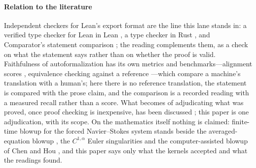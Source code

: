 \documentclass[preprint,11pt,authoryear,a4paper]{elsarticle}
\begin{document}
\paragraph{Relation to the literature} Independent checkers for Lean's export format are the line this lane stands in: a verified type checker for Lean in Lean \citep{Carneiro24Lean4Lean}, a type checker in Rust \citep{Nanoda}, and Comparator's statement comparison \citep{Comparator}; the reading complements them, as a check on what the statement says rather than on whether the proof is valid. Faithfulness of autoformalization has its own metrics and benchmarks---alignment scores \citep{Lu24FormalAlign}, equivalence checking against a reference \citep{Liu25BEq,Poiroux25BEq}---which compare a machine's translation with a human's; here there is no reference translation, the statement is compared with the prose claim, and the comparison is a recorded reading with a measured recall rather than a score. What becomes of adjudicating what was proved, once proof checking is inexpensive, has been discussed \citep{Kallel26,Avigad24}; this paper is one adjudication, with its scope. On the mathematics itself nothing is claimed: finite-time blowup for the forced Navier--Stokes system stands beside the averaged-equation blowup \citep{Tao16Averaged}, the $C^{1,\alpha}$ Euler singularities \citep{Elgindi21} and the computer-assisted blowup of Chen and Hou \citep{ChenHou22,ChenHou23}, and this paper says only what the kernels accepted and what the readings found.
\end{document}
